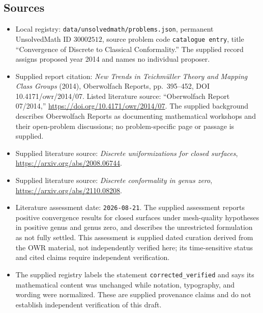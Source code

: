 \documentclass[11pt]{article}
\begin{document}
\subsection{Sources}
\begin{itemize}
\item Local registry: \texttt{data/unsolvedmath/problems.json}, permanent UnsolvedMath ID \(30002512\), source problem code \texttt{catalogue entry}, title ``Convergence of Discrete to Classical Conformality.'' The supplied record assigns proposed year 2014 and names no individual proposer.
\item Supplied report citation: \emph{New Trends in Teichm\"uller Theory and Mapping Class Groups} (2014), Oberwolfach Reports, pp.\ 395--452, DOI 10.4171/owr/2014/07. Listed literature source: ``Oberwolfach Report 07/2014,'' \url{https://doi.org/10.4171/owr/2014/07}. The supplied background describes Oberwolfach Reports as documenting mathematical workshops and their open-problem discussions; no problem-specific page or passage is supplied.
\item Supplied literature source: \emph{Discrete uniformizations for closed surfaces}, \url{https://arxiv.org/abs/2008.06744}.
\item Supplied literature source: \emph{Discrete conformality in genus zero}, \url{https://arxiv.org/abs/2110.08208}.
\item Literature assessment date: \texttt{2026-08-21}. The supplied assessment reports positive convergence results for closed surfaces under mesh-quality hypotheses in positive genus and genus zero, and describes the unrestricted formulation as not fully settled. This assessment is supplied dated curation derived from the OWR material, not independently verified here; its time-sensitive status and cited claims require independent verification.
\item The supplied registry labels the statement \texttt{corrected\_verified} and says its mathematical content was unchanged while notation, typography, and wording were normalized. These are supplied provenance claims and do not establish independent verification of this draft.
\end{itemize}
\end{document}
